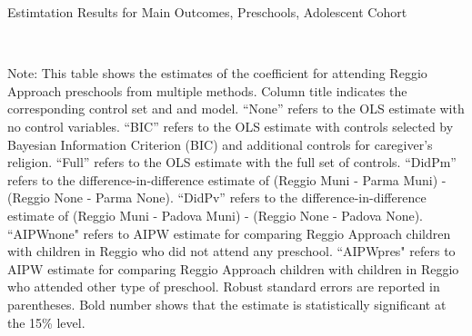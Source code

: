 \begin{table}[H] \caption{Estimtation Results for Main Outcomes, Preschools, Adolescent Cohort} \label{ols-M-adol-reg}
\scalebox{0.9}{}
\vspace{1ex} \\
\footnotesize\raggedright{Note: This table shows the estimates of the coefficient for attending Reggio Approach preschools from multiple methods. Column title indicates the corresponding control set and and model. ``None'' refers to the OLS estimate with no control variables. ``BIC'' refers to the OLS estimate with controls selected by Bayesian Information Criterion (BIC) and additional controls for caregiver's religion. ``Full'' refers to the OLS estimate with the full set of controls. ``DidPm'' refers to the difference-in-difference estimate of (Reggio Muni - Parma Muni) - (Reggio None - Parma None). ``DidPv'' refers to the difference-in-difference estimate of (Reggio Muni - Padova Muni) - (Reggio None - Padova None).  ``AIPWnone" refers to AIPW estimate for comparing Reggio Approach children with children in Reggio who did not attend any preschool. ``AIPWpres" refers to AIPW estimate for comparing Reggio Approach children with children in Reggio who attended other type of preschool. Robust standard errors are reported in parentheses. Bold number shows that the estimate is statistically significant at the 15\% level.}
\end{table}






